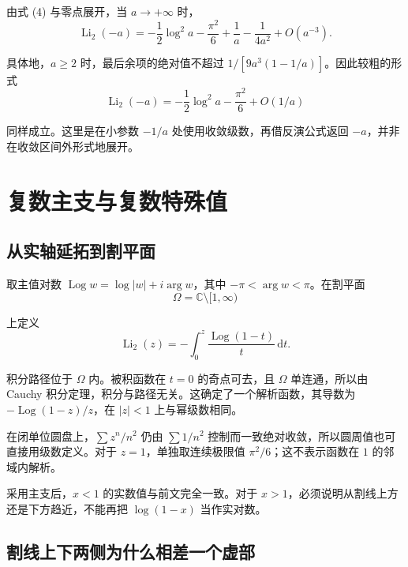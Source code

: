 \documentclass[11pt,a4paper]{article}
\begin{document}
由式 (4) 与零点展开，当 \(a\to+\infty\) 时，
\[
\operatorname{Li}_2(-a)
=-\frac12\log^2a-\frac{\pi^2}{6}
+\frac1a-\frac1{4a^2}+O(a^{-3}).
\]

具体地，\(a\geqslant2\) 时，最后余项的绝对值不超过
\(1/[9a^3(1-1/a)]\)。因此较粗的形式
\[
\operatorname{Li}_2(-a)=-\frac12\log^2a-\frac{\pi^2}{6}+O(1/a)
\]

同样成立。这里是在小参数 \(-1/a\) 处使用收敛级数，再借反演公式返回
\(-a\)，并非在收敛区间外形式地展开。

\hypertarget{ux590dux6570ux4e3bux652fux4e0eux590dux6570ux7279ux6b8aux503c}{%
\section{复数主支与复数特殊值}\label{ux590dux6570ux4e3bux652fux4e0eux590dux6570ux7279ux6b8aux503c}}

\hypertarget{ux4eceux5b9eux8f74ux5ef6ux62d3ux5230ux5272ux5e73ux9762}{%
\subsection{从实轴延拓到割平面}\label{ux4eceux5b9eux8f74ux5ef6ux62d3ux5230ux5272ux5e73ux9762}}

取主值对数 \(\operatorname{Log}w=\log|w|+i\arg w\)，其中
\(-\pi<\arg w<\pi\)。在割平面
\[
\Omega=\mathbb C\setminus[1,\infty)
\]

上定义
\[
\operatorname{Li}_2(z)=-\int_0^z\frac{\operatorname{Log}(1-t)}t\,\mathrm dt.
\]

积分路径位于 \(\Omega\) 内。被积函数在 \(t=0\) 的奇点可去，且 \(\Omega\)
单连通，所以由 Cauchy
积分定理，积分与路径无关。这确定了一个解析函数，其导数为
\(-\operatorname{Log}(1-z)/z\)，在 \(|z|<1\) 上与幂级数相同。

在闭单位圆盘上，\(\sum z^n/n^2\) 仍由 \(\sum1/n^2\)
控制而一致绝对收敛，所以圆周值也可直接用级数定义。对于
\(z=1\)，单独取连续极限值 \(\pi^2/6\)；这不表示函数在 \(1\)
的邻域内解析。

采用主支后，\(x<1\) 的实数值与前文完全一致。对于
\(x>1\)，必须说明从割线上方还是下方趋近，不能再把 \(\log(1-x)\)
当作实对数。

\hypertarget{ux5272ux7ebfux4e0aux4e0bux4e24ux4fa7ux4e3aux4ec0ux4e48ux76f8ux5deeux4e00ux4e2aux865aux90e8}{%
\subsection{割线上下两侧为什么相差一个虚部}\label{ux5272ux7ebfux4e0aux4e0bux4e24ux4fa7ux4e3aux4ec0ux4e48ux76f8ux5deeux4e00ux4e2aux865aux90e8}}
\end{document}
